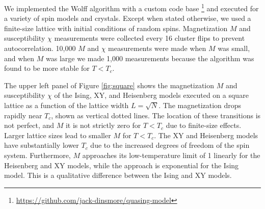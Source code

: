 \documentclass[
  amsmath,
  amssymb,
  aps,
  twocolumn,
  nofootinbib,
  floatfix,
]{revtex4-2}
\begin{document}
We implemented the Wolff algorithm with a custom code base \footnote{\url{https://github.com/jack-dinsmore/quasing-model}} and executed for a variety of spin models and crystals. Except when stated otherwise, we used a finite-size lattice with initial conditions of random spins. Magnetization $M$ and susceptibility $\chi$ measurements were collected every 16 cluster flips to prevent autocorrelation. 10,000 $M$ and $\chi$ measurements were made when $M$ was small, and when $M$ was large we made 1,000 measurements because the algorithm was found to be more stable for $T< T_c$.

The upper left panel of Figure \ref{fig:square} shows the magnetization $M$ and susceptibility $\chi$ of the Ising, XY, and Heisenberg models executed on a square lattice as a function of the lattice width $L = \sqrt{N}$. The magnetization drops rapidly near $T_c$, shown as vertical dotted lines. The location of these transitions is not perfect, and $M$ it is not strictly zero for $T<T_c$ due to finite-size effects. Larger lattice sizes lead to smaller $M$ for $T<T_c$. The XY and Heisenberg models have substantially lower $T_c$ due to the increased degrees of freedom of the spin system. Furthermore, $M$ approaches its low-temperature limit of 1 linearly for the Heisenberg and XY models, while the approach is exponential for the Ising model. This is a qualitative difference between the Ising and XY models.
\end{document}
